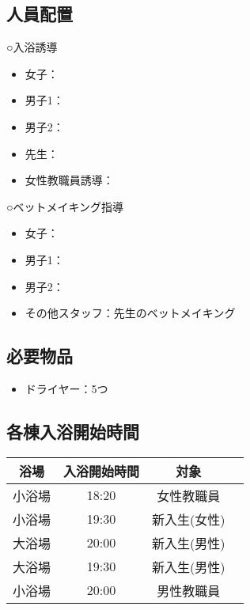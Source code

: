 \subsection{人員配置}
○入浴誘導
\begin{itemize}
 \item 女子：
 \item 男子1：
 \item 男子2：
 \item 先生：
 \item 女性教職員誘導：
\end{itemize}

\newpage

○ベットメイキング指導
\begin{itemize}
\item 女子：
\item 男子1：
\item 男子2：
\item その他スタッフ：先生のベットメイキング
\end{itemize}
\subsection{必要物品}
\begin{itemize}
\item ドライヤー：5つ
\end{itemize}

\subsection{各棟入浴開始時間}
\label{sec:bath}
\begin{table}[h]
\begin{tabular}{|c|c|c|l|}
\hline
{浴場}&{入浴開始時間}&\multicolumn{1}{c|}{対象} \\ \hline\hline
 小浴場 & 18:20 & 女性教職員 \\ \hline
 小浴場 & 19:30 & 新入生(女性) \\ \hline
 大浴場 & 20:00 & 新入生(男性) \\ \hline
 大浴場 & 19:30 & 新入生(男性) \\ \hline
 小浴場 & 20:00 & 男性教職員 \\ \hline
\end{tabular}
\end{table}
